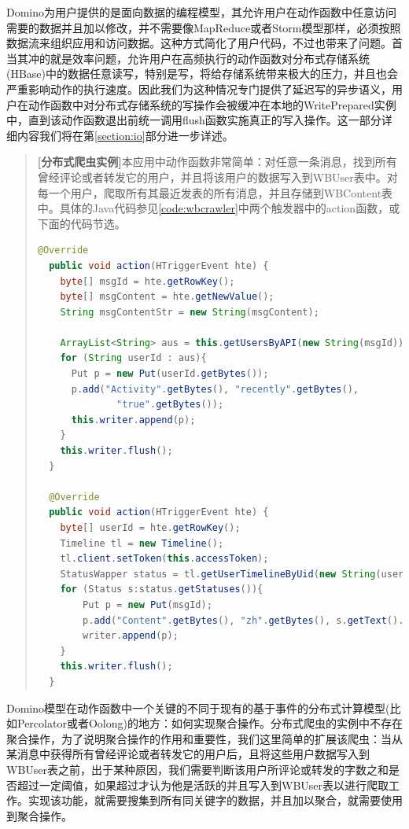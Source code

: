 Domino为用户提供的是面向数据的编程模型，其允许用户在动作函数中任意访问需要的数据并且加以修改，并不需要像MapReduce或者Storm模型那样，必须按照数据流来组织应用和访问数据。这种方式简化了用户代码，不过也带来了问题。首当其冲的就是效率问题，允许用户在高频执行的动作函数对分布式存储系统(HBase)中的数据任意读写，特别是写，将给存储系统带来极大的压力，并且也会严重影响动作的执行速度。因此我们为这种情况专门提供了延迟写的异步语义，用户在动作函数中对分布式存储系统的写操作会被缓冲在本地的WritePrepared实例中，直到该动作函数退出前统一调用flush函数实施真正的写入操作。这一部分详细内容我们将在第\ref{section:io}部分进一步详述。

\begin{quotation}
\textbf{[分布式爬虫实例]}本应用中动作函数非常简单：对任意一条消息，找到所有曾经评论或者转发它的用户，并且将该用户的数据写入到WBUser表中。对每一个用户，爬取所有其最近发表的所有消息，并且存储到WBContent表中。具体的Java代码参见\ref{code:wbcrawler}中两个触发器中的action函数，或下面的代码节选。
\begin{lstlisting}[language=java]
  @Override
  public void action(HTriggerEvent hte) {
    byte[] msgId = hte.getRowKey();
    byte[] msgContent = hte.getNewValue();
    String msgContentStr = new String(msgContent);

    ArrayList<String> aus = this.getUsersByAPI(new String(msgId));
    for (String userId : aus){
      Put p = new Put(userId.getBytes());
      p.add("Activity".getBytes(), "recently".getBytes(),
      		  "true".getBytes());
      this.writer.append(p);
    }
    this.writer.flush();
  }
  
  @Override
  public void action(HTriggerEvent hte) {
	byte[] userId = hte.getRowKey();
	Timeline tl = new Timeline();
	tl.client.setToken(this.accessToken);
	StatusWapper status = tl.getUserTimelineByUid(new String(userId));
	for (Status s:status.getStatuses()){
		Put p = new Put(msgId);
		p.add("Content".getBytes(), "zh".getBytes(), s.getText().getBytes());
		writer.append(p);
	}
	this.writer.flush();
  }
\end{lstlisting}
\end{quotation}

Domino模型在动作函数中一个关键的不同于现有的基于事件的分布式计算模型(比如Percolator或者Oolong)的地方：如何实现聚合操作。分布式爬虫的实例中不存在聚合操作，为了说明聚合操作的作用和重要性，我们这里简单的扩展该爬虫：当从某消息中获得所有曾经评论或者转发它的用户后，且将这些用户数据写入到WBUser表之前，出于某种原因，我们需要判断该用户所评论或转发的字数之和是否超过一定阈值，如果超过才认为他是活跃的并且写入到WBUser表以进行爬取工作。实现该功能，就需要搜集到所有同关键字的数据，并且加以聚合，就需要使用到聚合操作。

